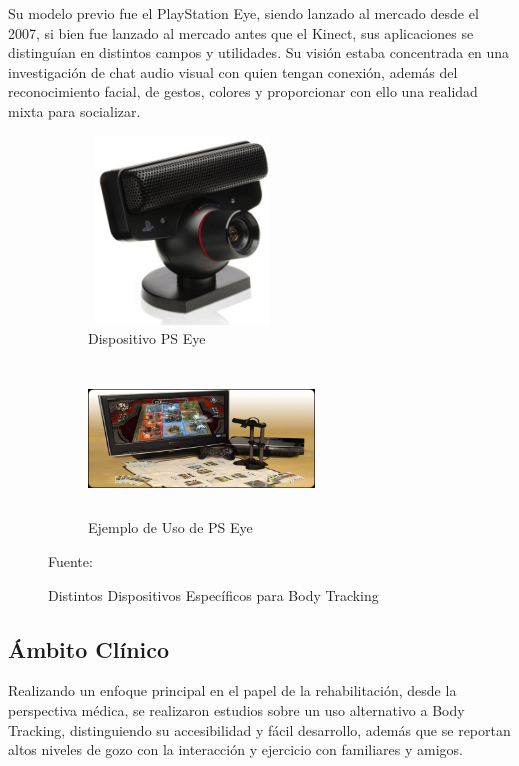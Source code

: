 Su modelo previo fue el PlayStation Eye, siendo lanzado al mercado desde el 2007, si bien fue lanzado al mercado antes que el Kinect, sus aplicaciones se distinguían en distintos campos y utilidades. Su visión estaba concentrada en una investigación de chat audio visual con quien tengan conexión, además del reconocimiento facial, de gestos, colores y proporcionar con ello una realidad mixta para socializar.
\begin{figure}
	\centering
	\begin{subfigure}{0.5\textwidth}
		\centering
		\includegraphics[width=5cm,height=5cm,]{./Images/eyeex.jpg}
		\caption{Dispositivo PS Eye}
		\label{eyeex}
	\end{subfigure}%
	\begin{subfigure}{0.5\textwidth}
		\centering
		\includegraphics[width=6cm,height=4cm,]{./Images/eyeexuse.jpg}
		\caption{Ejemplo de Uso de PS Eye}
		\label{eyeexuse}
	\end{subfigure}
	\caption{Distintos Dispositivos Específicos para Body Tracking}
	\footnotesize Fuente: \cite{eyeex} \cite{eyeexuse}
	\label{eyeExample}
\end{figure}

\subsection{Ámbito Clínico}
Realizando un enfoque principal en el papel de la rehabilitación, desde la perspectiva médica, se realizaron estudios sobre un uso alternativo a Body Tracking, distinguiendo su accesibilidad y fácil desarrollo, además que se reportan altos niveles de gozo con la interacción y ejercicio con familiares y amigos. 

